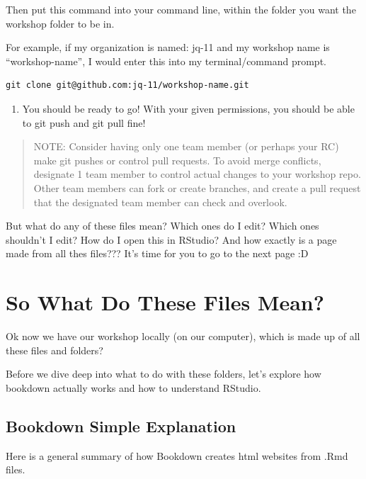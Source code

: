 \documentclass[
]{book}
\providecommand{\tightlist}{%
  \setlength{\itemsep}{0pt}\setlength{\parskip}{0pt}}
\theoremstyle{definition}
\theoremstyle{definition}
\theoremstyle{definition}
\theoremstyle{definition}
\theoremstyle{remark}
\begin{document}
Then put this command into your command line, within the folder you want the workshop folder to be in.

For example, if my organization is named: jq-11 and my workshop name is ``workshop-name'', I would enter this into my terminal/command prompt.

\begin{verbatim}
git clone git@github.com:jq-11/workshop-name.git
\end{verbatim}

\begin{enumerate}
\def\labelenumi{\arabic{enumi}.}
\setcounter{enumi}{3}
\tightlist
\item
  You should be ready to go! With your given permissions, you should be able to git push and git pull fine!
\end{enumerate}

\begin{quote}
NOTE: Consider having only one team member (or perhaps your RC) make git pushes or control pull requests. To avoid merge conflicts, designate 1 team member to control actual changes to your workshop repo. Other team members can fork or create branches, and create a pull request that the designated team member can check and overlook.
\end{quote}

But what do any of these files mean? Which ones do I edit? Which ones shouldn't I edit? How do I open this in RStudio? And how exactly is a page made from all thes files??? It's time for you to go to the next page :D

\chapter{So What Do These Files Mean?}\label{so-what-do-these-files-mean}

Ok now we have our workshop locally (on our computer), which is made up of all these files and folders?

Before we dive deep into what to do with these folders, let's explore how bookdown actually works and how to understand RStudio.

\section{Bookdown Simple Explanation}\label{bookdown-simple-explanation}

Here is a general summary of how Bookdown creates html websites from .Rmd files.
\end{document}
